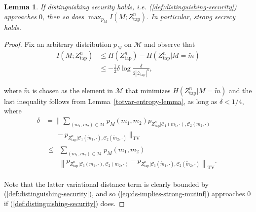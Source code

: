 \documentclass[journal]{IEEEtran}
\newcommand{\lemmaconst}{\delta}
\newcommand{\codebookpmf}{p}
\newcommand{\channelOut}{Z}
\newcommand{\channelOutAlph}{\mathcal{Z}}
\newcommand{\channelOutAlphWiretapper}{\channelOutAlph_\mathrm{tap}}
\newcommand{\channelOutWiretapper}{\channelOut_\mathrm{tap}}
\newcommand{\codebookOne}{\mathcal{C}_1}
\newcommand{\codebookTwo}{\mathcal{C}_2}
\newcommand{\codebookBlocklength}{n}
\newcommand{\mutualInformation}[2]{I(#1;#2)}
\newcommand{\entropy}[1]{H(#1)}
\newcommand{\entropyConditional}[2]{H(#1 | #2)}
\newcommand{\totalvariationBigg}[1]{\Bigg\lVert #1 \Bigg\rVert_\mathrm{TV}}
\newcommand{\totalvariationlr}[1]{\left\lVert #1 \right\rVert_\mathrm{TV}}
\newcommand{\absolute}[1]{\left\lvert #1 \right\rvert}
\newcommand{\messageRV}{M}
\newcommand{\messageAlphabet}{\mathcal{M}}
\newcommand{\messageAlphabetElement}{m}
\newtheorem{lemma}{Lemma}
\begin{document}
\begin{lemma}
\label{lemma:distinguishing-implies-strong}
If distinguishing security holds, i.e. (\ref{def:distinguishing-security}) approaches $0$, then so does $\max_{\codebookpmf_\messageRV} \mutualInformation{\messageRV}{\channelOutWiretapper^\codebookBlocklength}$. In particular, strong secrecy holds.
\end{lemma}
\begin{proof}
Fix an arbitrary distribution $\codebookpmf_\messageRV$ on $\messageAlphabet$ and observe that
\begin{align}
\mutualInformation{\messageRV}{\channelOutWiretapper^\codebookBlocklength}
&\leq
\entropy{\channelOutWiretapper^\codebookBlocklength} - \entropyConditional{\channelOutWiretapper^\codebookBlocklength}{\messageRV = \tilde{\messageAlphabetElement}}
\\
\label{eq:ds-implies-strong-mutinf}
&\leq
-\frac{1}{2}
\lemmaconst
\log \frac{\lemmaconst}
          {2\absolute{\channelOutAlphWiretapper}^\codebookBlocklength},
\end{align}

where $\tilde{\messageAlphabetElement}$ is chosen as the element in $\messageAlphabet$ that minimizes $\entropyConditional{\channelOutWiretapper^\codebookBlocklength}{\messageRV = \tilde{\messageAlphabetElement}}$ and the last inequality follows from Lemma~\ref{totvar-entropy-lemma}, as long as $\lemmaconst < 1/4$, where
\begin{align*}
\lemmaconst
&
=
\totalvariationBigg{
  \sum\limits_{(\messageAlphabetElement_1, \messageAlphabetElement_2) \in \messageAlphabet}
    \codebookpmf_\messageRV(\messageAlphabetElement_1, \messageAlphabetElement_2)
    \codebookpmf_{\channelOutWiretapper^\codebookBlocklength | \codebookOne(\messageAlphabetElement_1,\cdot), \codebookTwo(\messageAlphabetElement_2, \cdot)}
  \\
  &~~~~~~~-
  \codebookpmf_{\channelOutWiretapper^\codebookBlocklength | \codebookOne(\tilde{\messageAlphabetElement}_1,\cdot), \codebookTwo(\tilde{\messageAlphabetElement}_2, \cdot)}
}
\\
&
\begin{aligned}
\leq
&\sum\limits_{(\messageAlphabetElement_1, \messageAlphabetElement_2) \in \messageAlphabet}
\codebookpmf_\messageRV(\messageAlphabetElement_1, \messageAlphabetElement_2)
\\
&
\totalvariationlr{
  \codebookpmf_{\channelOutWiretapper^\codebookBlocklength | \codebookOne(\messageAlphabetElement_1,\cdot), \codebookTwo(\messageAlphabetElement_2, \cdot)}
  -
  \codebookpmf_{\channelOutWiretapper^\codebookBlocklength | \codebookOne(\tilde{\messageAlphabetElement}_1,\cdot), \codebookTwo(\tilde{\messageAlphabetElement}_2, \cdot)}
}.
\end{aligned}
\end{align*}

Note that the latter variational distance term is clearly bounded by (\ref{def:distinguishing-security}), and so (\ref{eq:ds-implies-strong-mutinf}) approaches $0$ if (\ref{def:distinguishing-security}) does.
\end{proof}
\end{document}
